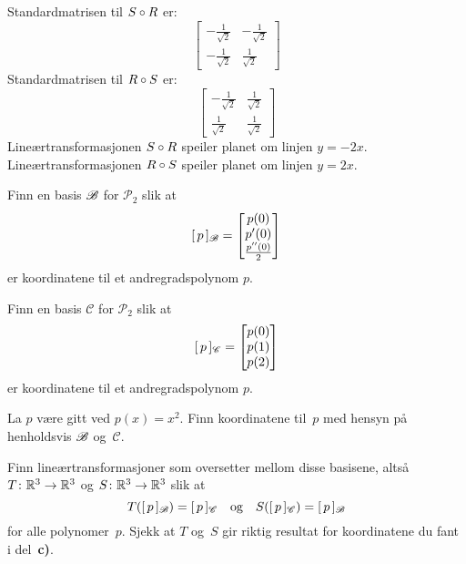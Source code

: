 \begin{losning}
Standardmatrisen til $S \circ R$ er:
\[
\begin{bmatrix}
-\frac{1}{\sqrt{2}} & -\frac{1}{\sqrt{2}} \\
-\frac{1}{\sqrt{2}} & \frac{1}{\sqrt{2}} 
\end{bmatrix}
\]
Standardmatrisen til $R \circ S$ er:
\[
\begin{bmatrix}
-\frac{1}{\sqrt{2}} & \frac{1}{\sqrt{2}} \\
\frac{1}{\sqrt{2}}  & \frac{1}{\sqrt{2}} 
\end{bmatrix}
\]
Lineærtransformasjonen $S \circ R$ speiler planet om linjen
$y = -2x$.
Lineærtransformasjonen $R \circ S$ speiler planet om linjen
$y = 2x$.
\end{losning}


\begin{oppgave}
\begin{punkt}
Finn en basis $\mathscr{B}$ for $\mathcal{P}_2$ slik at
\[
[\,{p}\,]_{\mathscr{B}}
 =
\begin{bmatrix} p(0) \\ p'(0) \\ \frac{p''(0)}{2} \end{bmatrix}
\]
er koordinatene til et andregradspolynom $p$.
\end{punkt}

\begin{punkt}
Finn en basis $\mathscr{C}$ for $\mathcal{P}_2$ slik at
\[
[\,{p}\,]_{\mathscr{C}}
 =
\begin{bmatrix} p(0) \\ p(1) \\ p(2) \end{bmatrix}
\]
er koordinatene til et andregradspolynom $p$.
\end{punkt}

\begin{punkt}
La $p$ være gitt ved $p(x) = x^2$.
Finn koordinatene til~$p$ med hensyn på henholdsvis $\mathscr{B}$ og~$\mathscr{C}$.
\end{punkt}

\begin{punkt}
Finn lineærtransformasjoner som oversetter mellom disse basisene,
altså
$T \colon \mathbb{R}^3 \to \mathbb{R}^3$ og
$S \colon \mathbb{R}^3 \to \mathbb{R}^3$
slik at
\[
T( [\,{p}\,]_{\mathscr{B}} ) = [\,{p}\,]_{\mathscr{C}}
\quad\text{og}\quad
S( [\,{p}\,]_{\mathscr{C}} ) = [\,{p}\,]_{\mathscr{B}}
\]
for alle polynomer~$p$.
Sjekk at $T$ og~$S$ gir riktig resultat for koordinatene du fant i
del~\textbf{c)}.
\end{punkt}

\end{oppgave}

